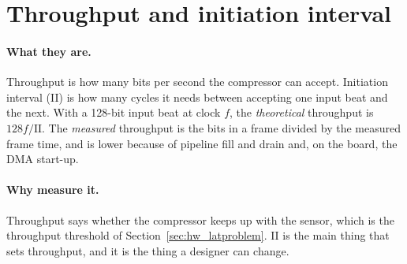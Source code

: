 \section{Throughput and initiation interval}
\label{sec:hw_throughput}

\paragraph{What they are.} Throughput is how many bits per second the
compressor can accept. Initiation interval (II) is how many cycles it needs
between accepting one input beat and the next. With a 128-bit input beat at
clock $f$, the \emph{theoretical} throughput is $128 f / \mathrm{II}$. The
\emph{measured} throughput is the bits in a frame divided by the measured frame
time, and is lower because of pipeline fill and drain and, on the board, the DMA
start-up.

\paragraph{Why measure it.} Throughput says whether the compressor keeps up
with the sensor, which is the throughput threshold of
Section~\ref{sec:hw_latproblem}. II is the main thing that sets throughput, and
it is the thing a designer can change.

